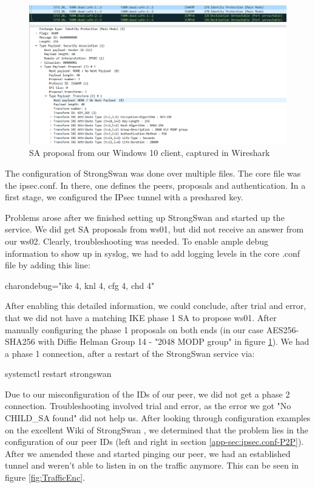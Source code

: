 \documentclass[a4paper]{report}
\begin{document}
\begin{figure}[htb]
	\includegraphics[width=\linewidth]{IPsec_Proposal_Win10_client.png}
	\caption{SA proposal from our Windows 10 client, captured in Wireshark}
	\label{fig:FirstSAProposal}
\end{figure}

The configuration of StrongSwan was done over multiple files. The core file was the ipsec.conf. In there, one defines the peers, proposals and authentication.
In a first stage, we configured the IPsec tunnel with a preshared key.

Problems arose after we finished setting up StrongSwan and started up the service. We did get SA proposals from ws01, but did not receive an answer from our ws02. Clearly, troubleshooting was needed. To enable ample debug information to show up in syslog, we had to add logging levels in the core .conf file by adding this line:
\begin{codebox}
	charondebug="ike 4, knl 4, cfg 4, chd 4"
\end{codebox}
After enabling this detailed information, we could conclude, after trial and error, that we did not have a matching IKE phase 1 SA to propose ws01. After manually configuring the phase 1 proposals on both ends (in our case AES256-SHA256 with Diffie Helman Group 14 - "2048 MODP group" in figure \ref{fig:FirstSAProposal}). We had a phase 1 connection, after a restart of the StrongSwan service via:
\begin{codebox}
	systemctl restart strongswan
\end{codebox}
Due to our misconfiguration of the IDs of our peer, we did not get a phase 2 connection. Troubleshooting involved trial and error, as the error we got "No CHILD\_SA found" did not help us. After looking through configuration examples on the excellent Wiki of StrongSwan \parencite{Lang2017}, we determined that the problem lies in the configuration of our peer IDs (left and right in section \ref{app-sec:ipsec.conf-P2P}). After we amended these and started pinging our peer, we had an established tunnel and weren't able to listen in on the traffic anymore. This can be seen in figure \ref{fig:TrafficEnc}.
\end{document}
